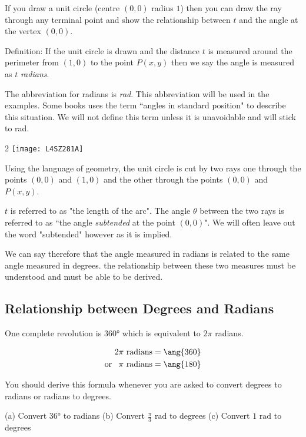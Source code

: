 If you draw a unit circle (centre $\left (0 ,0\right )$ radius $1$) then you can draw the ray through any terminal point and show the relationship between $t$ and the angle at the vertex $\left (0 ,0\right )$. 

Definition: If the unit circle is drawn and the distance $t$ is measured around the perimeter from $\left (1 ,0\right )$ to the point $P (x ,y)$ then we say the angle is measured as $t$ \emph{radians}. 

The abbreviation for radians is \textit{rad}. This abbreviation will be used in the examples.
Some books uses the term ``angles in standard position" to describe this situation. We
will not define this term unless it is unavoidable and will stick to rad.

\columnsep =30pt
\begin {multicols}{2}
\texttt{[image: L4SZ281A]}
\columnbreak

Using the language of geometry, the unit circle is cut by two rays one through the points $\left (0 ,0\right )$ and $\left (1 ,0\right )$ and the other through the points $\left (0 ,0\right )$ and $P \left (x ,y\right )$. 

$t$ is referred to as "the length of the arc". The angle $\theta $ between the two rays is referred to as ``the angle \emph{subtended} at the point $\left (0 ,0\right )$". We will often leave out the word "subtended" however as it is implied. 
\end {multicols}
We can say therefore that the angle measured in radians is related to the same angle measured in degrees. the relationship between these two measures must be understood and must be able to be derived. 

\subsection*{Relationship between Degrees and Radians}
One complete revolution is \ang{360} which is equivalent to $2 \pi $ radians.
\begin{tcolorbox}\begin{align*}
2\pi \text{ radians} &=  \ang{360}\\
\text{or\,  \ }\pi \text{ radians} &=  \ang{180}
\end{align*}
\end{tcolorbox}
You should derive this formula whenever you are asked to convert degrees to radians or radians
to degrees. 

\example
(a) Convert \ang{36} to radians 
(b) Convert $\frac{\pi }{3}$ $\mbox{rad}$ to degrees 
(c) Convert $1$ $\mbox{rad}$ to degrees \medskip\\

